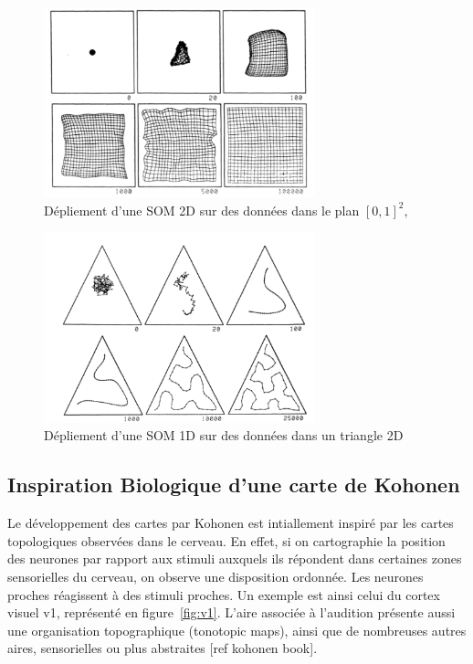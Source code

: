 \documentclass[../main]{subfiles}
\begin{document}
\begin{figure}
\centering
\includegraphics[width=0.7\textwidth]{som2d}
\caption{Dépliement d'une SOM 2D sur des données dans le plan $[0,1]^2$, \cite{Kohonen1995SelfOrganizingM} \label{fig:som2d}}

\end{figure}

\begin{figure}
\centering
\includegraphics[width=0.7\textwidth]{som1d}
\caption{Dépliement d'une SOM 1D sur des données dans un triangle 2D \cite{Kohonen1995SelfOrganizingM}\label{fig:som1d}}

\end{figure}

\subsection{Inspiration Biologique d'une carte de Kohonen}

Le développement des cartes par Kohonen est intiallement inspiré par les cartes topologiques observées dans le cerveau. En effet, si on cartographie la position des neurones par rapport aux stimuli auxquels ils répondent dans certaines zones sensorielles du cerveau, on observe une disposition ordonnée. Les neurones proches réagissent à des stimuli proches. Un exemple est ainsi celui du cortex visuel v1, représenté en figure~\ref{fig:v1}. L'aire associée à l'audition présente aussi une organisation topographique (tonotopic maps), ainsi que de nombreuses autres aires, sensorielles ou plus abstraites [ref kohonen book].
\end{document}
